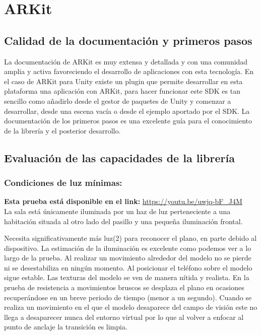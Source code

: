 \section{ARKit}
\subsection{Calidad de la documentación y primeros pasos}
La documentación de ARKit es muy extensa y detallada y con una comunidad amplia y activa favoreciendo el desarrollo de aplicaciones con esta tecnología. En el caso de ARKit para Unity existe un plugin que permite desarrollar en esta plataforma una aplicación con ARKit, para hacer funcionar este SDK es tan sencillo como añadirlo desde el gestor de paquetes de Unity y comenzar a desarrollar, desde una escena vacía o desde el ejemplo aportado por el SDK. La documentación de los primeros pasos es una excelente guía para el conocimiento de la librería y el posterior desarrollo.

\subsection{Evaluación de las capacidades de la librería}

\subsubsection{Condiciones de luz mínimas:}

\textbf{Esta prueba está disponible en el link:} \url{https://youtu.be/uwjq-bF_J4M}\\

La sala está únicamente iluminada por un haz de luz perteneciente a una habitación situada al otro lado del pasillo y una pequeña iluminación frontal.

Necesita significativamente más luz(2) para reconocer el plano, en parte debido al dispositivo. La estimación de la iluminación es excelente como podemos ver a lo largo de la prueba. Al realizar un movimiento alrededor del modelo no se pierde ni se desestabiliza en ningún momento. Al posicionar el teléfono sobre el modelo sigue estable. Las texturas del modelo se ven de manera nítida y realista. En la prueba de resistencia a movimientos bruscos se desplaza el plano en ocasiones recuperándose en un breve periodo de tiempo (menor a un segundo). Cuando se realiza un movimiento en el que el modelo desaparece del campo de visión este no llega a desaparecer nunca del entorno virtual por lo que al volver a enfocar al punto de anclaje la transición es limpia.


